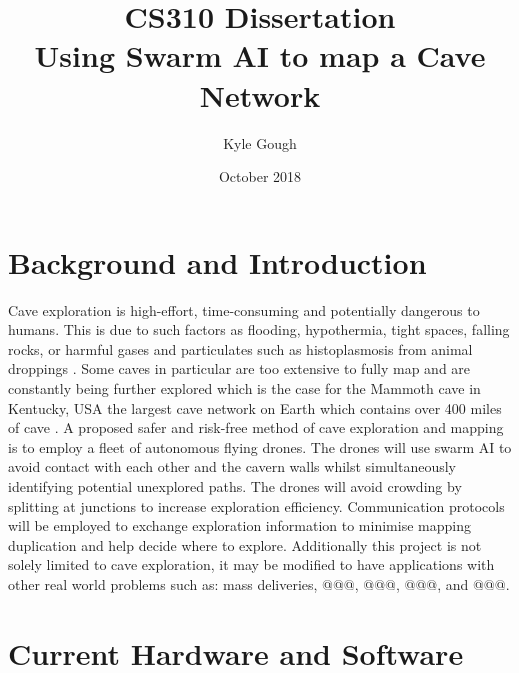 \documentclass[12pt]{article}
\title{CS310 Dissertation\\Using Swarm AI to map a Cave Network}
\author{Kyle Gough}
\date{October 2018}
\begin{document}
\maketitle

\section{Background and Introduction}

Cave exploration is high-effort, time-consuming and potentially dangerous to humans. This is due to such factors as flooding, hypothermia, tight spaces, falling rocks, or harmful gases and particulates such as histoplasmosis from animal droppings \cite{Histoplasmosis}. Some caves in particular are too extensive to fully map and are constantly being further explored which is the case for the Mammoth cave in Kentucky, USA the largest cave network on Earth which contains over 400 miles of cave \cite{Mammoth}. A proposed safer and risk-free method of cave exploration and mapping is to employ a fleet of autonomous flying drones. The drones will use swarm AI to avoid contact with each other and the cavern walls whilst simultaneously identifying potential unexplored paths. The drones will avoid crowding by splitting at junctions to increase exploration efficiency. Communication protocols will be employed to exchange exploration information to minimise mapping duplication and help decide where to explore. Additionally this project is not solely limited to cave exploration, it may be modified to have applications with other real world problems such as: mass deliveries, @@@, @@@, @@@, and @@@.


\section{Current Hardware and Software}
\end{document}
